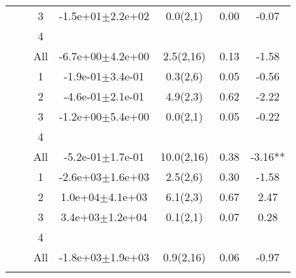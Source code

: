 \begin{longtable}{llccccS[table-format=-2.2, table-space-text-post = {***}]}
   &  & 3 & -1.5e+01$\pm$2.2e+02 & 0.0(2,1) & 0.00 & -0.07 \\ 
   &  & 4 &  &  &  &  \\ 
   &  & All & -6.7e+00$\pm$4.2e+00 & 2.5(2,16) & 0.13 & -1.58 \\ 
   \midrule
{} & {} & 1 & -1.9e-01$\pm$3.4e-01 & 0.3(2,6) & 0.05 & -0.56 \\ 
   &  & 2 & -4.6e-01$\pm$2.1e-01 & 4.9(2,3) & 0.62 & -2.22 \\ 
   &  & 3 & -1.2e+00$\pm$5.4e+00 & 0.0(2,1) & 0.05 & -0.22 \\ 
   &  & 4 &  &  &  &  \\ 
   &  & All & -5.2e-01$\pm$1.7e-01 & 10.0(2,16) & 0.38 & -3.16** \\ 
   \midrule
{} & {} & 1 & -2.6e+03$\pm$1.6e+03 & 2.5(2,6) & 0.30 & -1.58 \\ 
   &  & 2 &  1.0e+04$\pm$4.1e+03 & 6.1(2,3) & 0.67 & 2.47 \\ 
   &  & 3 &  3.4e+03$\pm$1.2e+04 & 0.1(2,1) & 0.07 & 0.28 \\ 
   &  & 4 &  &  &  &  \\ 
   &  & All & -1.8e+03$\pm$1.9e+03 & 0.9(2,16) & 0.06 & -0.97 \\ 
   \bottomrule
\label{bivar_lm_summ}
\end{longtable}

